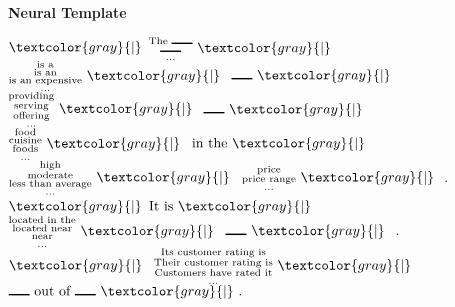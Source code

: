 \begin{frame}
\centerline{\textbf{Neural Template}}
\air

      \begin{center}

$\textcolor{gray}{|} $ $ \substack{\text{The \rule{15pt}{1pt}}\\\text{\rule{15pt}{1pt}}\\ \dots}
\ \textcolor{gray}{|} \  $ $ \substack{\text{is a}\\\text{is an}\\\text{is an expensive}\\ \dots}
\ \textcolor{gray}{|} \  $ $ \text{\rule{15pt}{1pt}} \ \textcolor{gray}{|} \  $ $ \substack{\text{providing}\\\text{serving}\\\text{offering}\\ \dots}
\ \textcolor{gray}{|} \  $ $ \text{\rule{15pt}{1pt}} \ \textcolor{gray}{|} \  $ $ \substack{\text{food}\\\text{cuisine}\\\text{foods}\\ \dots}
\ \textcolor{gray}{|} \  $ $ \text{in the} \ \textcolor{gray}{|} \  $ $ \substack{\text{high}\\\text{moderate}\\\text{less than average}\\ \dots}
\ \textcolor{gray}{|} \  $ $ \substack{\text{price}\\\text{price range}\\ \dots}
\ \textcolor{gray}{|} \  $ $ \text{.}$ $\textcolor{gray}{|}$ $ \text{It is} \ \textcolor{gray}{|} \  $ $ \substack{\text{located in the}\\\text{located near}\\\text{near}\\ \dots}
\ \textcolor{gray}{|} \  $ $ \text{\rule{15pt}{1pt}} \ \textcolor{gray}{|} \  $ $ \text{.}$ $ \textcolor{gray}{|} \  $ $ \substack{\text{Its customer rating is}\\\text{Their customer rating is}\\\text{Customers have rated it}\\ \dots}
\ \textcolor{gray}{|} \  $ $ \text{\rule{15pt}{1pt} out of \rule{15pt}{1pt}} \ \textcolor{gray}{|} \  .$
    \end{center}
\end{frame}

